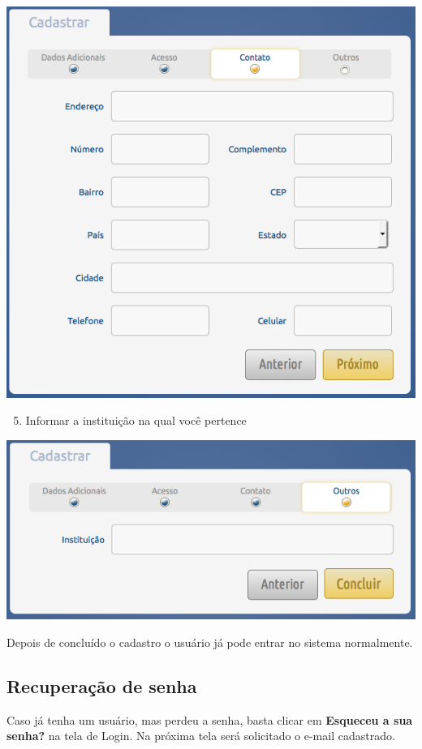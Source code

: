 \documentclass[letterpaper,10pt,english]{sphinxmanual}
\begin{document}
{\includegraphics{register-04.png}\hfill}
\begin{enumerate}
\setcounter{enumi}{4}
\item {} 
Informar a instituição na qual você pertence

\end{enumerate}

{\includegraphics{register-05.png}\hfill}

Depois de concluído o cadastro o usuário já pode entrar no sistema normalmente.


\subsection{Recuperação de senha}
\label{access:recuperacao-de-senha}\label{access:recuperar-senha}
Caso já tenha um usuário, mas perdeu a senha, basta clicar em \textbf{Esqueceu a sua senha?} na tela de Login. Na próxima tela será solicitado o e-mail cadastrado.
\end{document}
